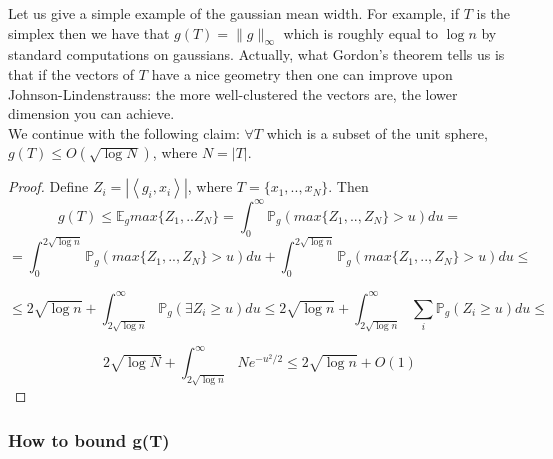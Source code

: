 \documentclass[11pt]{article}
\newcommand{\inprod}[1]{\left\langle #1 \right\rangle}
\begin{document}
Let us give a simple example of the gaussian mean width. For example, if $T$ is the simplex then we have that $g(T)= \|g \|_{\infty}$ which is roughly equal to $\log n$ by standard computations on gaussians. Actually, what Gordon's theorem tells us is that if the vectors of $T$ have a nice geometry then one can improve upon Johnson-Lindenstrauss: the more well-clustered the vectors are, the lower dimension you can achieve. \\

We continue with the following claim: $\forall T$ which is a subset of the unit sphere, $g(T) \leq O(\sqrt{\log N})$, where $N = |T|$.

\begin{proof}
Define $Z_i = |\inprod{g_i,x_i}|$, where $T=\{x_1,..,x_N\}$. Then \[g(T) \leq \mathbb{E}_g max\{Z_1,..Z_N\} = \int_0^{\infty} \mathbb{P}_g( max\{Z_1,..,Z_N\} >u ) du =\] \[= \int_0^{2\sqrt{\log n}} \mathbb{P}_g( max\{Z_1,..,Z_N\} >u ) du + \int_0^{2\sqrt{\log n}} \mathbb{P}_g( max\{Z_1,..,Z_N\} >u ) du \leq \] 

\[ \leq  2\sqrt{\log n} + \int_{2\sqrt{\log n}}^{\infty} \mathbb{P}_g( \exists Z_i \geq u) du \leq 2\sqrt{\log n} +  \int_{2\sqrt{\log n}}^{\infty} \sum_i \mathbb{P}_g( Z_i \geq u) du \leq		\]


\[ 2\sqrt{\log N} + \int_{2\sqrt{\log n}}^{\infty} Ne^{-u^2/2} \leq 2\sqrt{\log n} + O(1)				\]

\end{proof}
 
 
\subsubsection{ How to bound g(T)} 
\end{document}
